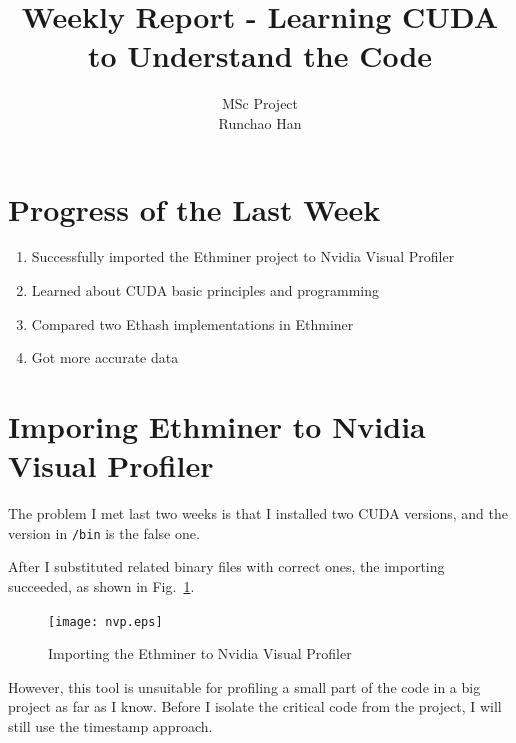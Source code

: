 \documentclass[11pt]{article}
\begin{document}
\title{Weekly Report - Learning CUDA to Understand the Code}
\author{MSc Project \\
Runchao Han \\
}
\maketitle
%
%

\section{Progress of the Last Week}

\begin{enumerate}
\item Successfully imported the Ethminer project to Nvidia Visual Profiler
\item Learned about CUDA basic principles and programming
\item Compared two Ethash implementations in Ethminer
\item Got more accurate data
\end{enumerate}

\section{Imporing Ethminer to Nvidia Visual Profiler}

The problem I met last two weeks is that I installed two CUDA versions, and the version in \texttt{/bin} is the false one.

After I substituted related binary files with correct ones, the importing succeeded, as shown in Fig.~\ref{fig:nvp}.

\begin{figure}[h]
    \centering
    \texttt{[image: nvp.eps]}
    \caption{Importing the Ethminer to Nvidia Visual Profiler}
    \label{fig:nvp}
\end{figure}

However, this tool is unsuitable for profiling a small part of the code in a big project as far as I know. Before I isolate the critical code from the project, I will still use the timestamp approach.
\end{document}
